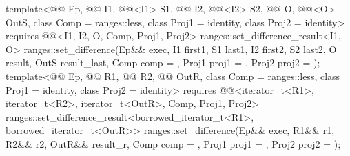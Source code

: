 \begin{itemdecl}
template<@@ Ep, @@ I1, @@<I1> S1,
         @@ I2, @@<I2> S2,
         @@ O, @@<O> OutS, class Comp = ranges::less,
         class Proj1 = identity, class Proj2 = identity>
  requires @@<I1, I2, O, Comp, Proj1, Proj2>
  ranges::set_difference_result<I1, O>
    ranges::set_difference(Ep&& exec, I1 first1, S1 last1,
                           I2 first2, S2 last2, O result, OutS result_last,
                           Comp comp = {}, Proj1 proj1 = {}, Proj2 proj2 = {});
template<@@ Ep, @@ R1, @@ R2,
         @@ OutR, class Comp = ranges::less,
         class Proj1 = identity, class Proj2 = identity>
  requires @@<iterator_t<R1>, iterator_t<R2>, iterator_t<OutR>, Comp, Proj1, Proj2>
  ranges::set_difference_result<borrowed_iterator_t<R1>, borrowed_iterator_t<OutR>>
    ranges::set_difference(Ep&& exec, R1&& r1, R2&& r2, OutR&& result_r, Comp comp = {},
                           Proj1 proj1 = {}, Proj2 proj2 = {});
\end{itemdecl}

